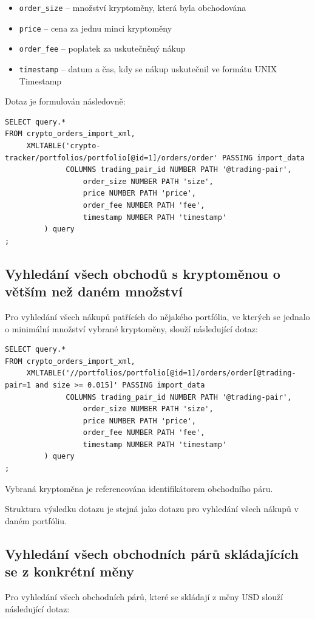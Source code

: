\documentclass[12pt, a4paper]{article}
\begin{document}
\begin{itemize}
    \item \texttt{order\_size} -- množství kryptoměny, která byla obchodována
    \item \texttt{price} -- cena za jednu minci kryptoměny
    \item \texttt{order\_fee} -- poplatek za uskutečněný nákup
    \item \texttt{timestamp} -- datum a čas, kdy se nákup uskutečnil ve formátu UNIX Timestamp
\end{itemize}

\noindent
Dotaz je formulován následovně:
\begin{lstlisting}
SELECT query.*
FROM crypto_orders_import_xml,
     XMLTABLE('crypto-tracker/portfolios/portfolio[@id=1]/orders/order' PASSING import_data
              COLUMNS trading_pair_id NUMBER PATH '@trading-pair',
                  order_size NUMBER PATH 'size',
                  price NUMBER PATH 'price',
                  order_fee NUMBER PATH 'fee',
                  timestamp NUMBER PATH 'timestamp'
         ) query
;
\end{lstlisting}


\subsection{Vyhledání všech obchodů s kryptoměnou o větším než daném množství}
Pro vyhledání všech nákupů patřících do nějakého portfólia, ve kterých se jednalo o minimální množství vybrané kryptoměny, slouží následující dotaz:

\begin{lstlisting}
SELECT query.*
FROM crypto_orders_import_xml,
     XMLTABLE('//portfolios/portfolio[@id=1]/orders/order[@trading-pair=1 and size >= 0.015]' PASSING import_data
              COLUMNS trading_pair_id NUMBER PATH '@trading-pair',
                  order_size NUMBER PATH 'size',
                  price NUMBER PATH 'price',
                  order_fee NUMBER PATH 'fee',
                  timestamp NUMBER PATH 'timestamp'
         ) query
;
\end{lstlisting}

Vybraná kryptoměna je referencována identifikátorem obchodního páru.

Struktura výsledku dotazu je stejná jako dotazu pro vyhledání všech nákupů v daném portfóliu.


\subsection{Vyhledání všech obchodních párů skládajících se z konkrétní měny}
Pro vyhledání všech obchodních párů, které se skládají z měny USD slouží následující dotaz:
\end{document}

